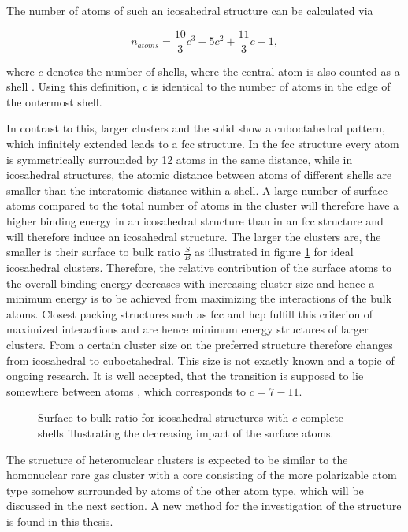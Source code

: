 The number of atoms of such an icosahedral structure can be calculated via

\begin{equation}
  n_{atoms} = \frac{10}{3} c^3 - 5 c^2 + \frac{11}{3} c -1 ,
\end{equation}

where $c$ denotes the number of shells, where the central atom is
also counted as a shell \cite{Martin96}. Using this definition, $c$ is
identical to the number of atoms
in the edge of the outermost shell.


In contrast to this, larger clusters and the solid show a cuboctahedral
pattern, which infinitely extended leads to a \ac{fcc} structure.
In the \ac{fcc} structure every atom is symmetrically surrounded
by 12 atoms in the same distance, while in icosahedral structures, the
atomic distance between atoms of different shells are smaller than the
interatomic distance within a shell. A large number of surface atoms
compared to the total number of atoms in the cluster will therefore have a
higher binding energy in an icosahedral structure than in an \ac{fcc} structure
and will therefore induce an icosahedral structure.
The larger the clusters are, the smaller is their surface to bulk
ratio $\frac{S}{B}$ as illustrated in                 
figure \ref{figure:surface_to_bulk} for ideal icosahedral clusters.
Therefore, the relative contribution
of the surface atoms to the overall binding energy decreases with increasing
cluster size and hence a minimum energy is to be achieved from maximizing
the interactions of the bulk atoms. Closest packing structures such as
\ac{fcc} and \ac{hcp} fulfill this criterion of maximized interactions and
are hence minimum energy structures of larger clusters. From a certain cluster size on the
preferred structure therefore changes from icosahedral to cuboctahedral. This size
is not exactly known and a topic of ongoing research. It is well accepted,
that the transition is supposed to lie somewhere between \unit[800--3000]{atoms}
\cite{Hartke02,Pahl08}, which corresponds to $c = 7 - 11$.

\begin{figure}[h]
 \centering
 
 \caption{Surface to bulk ratio for icosahedral structures with $c$ complete
          shells illustrating the decreasing impact of the surface atoms.}
 \label{figure:surface_to_bulk}
\end{figure}

The structure of heteronuclear clusters is expected to be similar to the
homonuclear rare gas cluster with a core consisting of the more polarizable
atom type somehow surrounded by atoms of the other atom type, which will be discussed
in the next section. 
A new method for the investigation of the structure is found
in this thesis.


